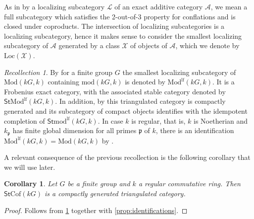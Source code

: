 \documentclass{amsart}
\def \pp{\mathfrak{p}}
\numberwithin{equation}{section}%
\newtheorem{corollary}[equation]{Corollary}
\theoremstyle{remark}
\newtheorem{remark}[equation]{Remark}
\newtheorem{recollection}[equation]{Recollection}
\begin{document}


As in \cite{BBIKP25} by a localizing subcategory $\mathcal{L}$ of an exact additive category $\mathcal{A}$, we mean a full subcategory which satisfies the 2-out-of-3 property for conflations and is closed under coproducts. The intersection of localizing subcategories is a localizing subcategory, hence it makes sense to consider the smallest localizing subcategory of $\mathcal{A}$ generated by a class $\mathcal{X}$ of objects of $\mathcal{A}$, which we denote by $\mathrm{Loc}(\mathcal{X})$.


\begin{recollection}\label{rec-modlf-comp}
By \cite[2.5]{BBIKP25} for a finite group $G$ the smallest localizing subcategory of $\mathrm{Mod}(kG,k)$ containing $\mathrm{mod}(kG,k)$ is denoted by $\mathrm{Mod}^{\mathrm{lf}}(kG,k)$. It is a Frobenius exact category, with the associated stable category denoted by $\mathsf{St}\mathrm{Mod}^{\mathrm{lf}}(kG,k)$. In addition, by \cite[Proposition~2.9]{BBIKP25} this triangulated category is compactly generated and its subcategory of compact objects identifies with the idempotent completion of $\mathsf{St}\mathrm{mod}^{\mathrm{lf}}(kG,k)$. In case $k$ is regular, that is, $k$ is Noetherian and $k_\pp$ has finite global dimension for all primes $\pp$ of $k$, there is an identification $\mathrm{Mod}^{\mathrm{lf}}(kG,k)=\mathrm{Mod}(kG,k)$ by \cite[Proposition~2.14]{BBIKP25}.
\end{recollection}  

A relevant consequence of the previous recollection is the following corollary that we will use later.  

\begin{corollary}\label{rec-regular-ring}
Let $G$ be a finite group and $k$ a regular commutative ring. Then $\mathsf{St}\mathrm{Cof}(kG)$ is a compactly generated triangulated category.
\end{corollary}

\begin{proof}

Follows from \cref{rec-modlf-comp} together with  \cref{prop:identifications}.
\end{proof}
\end{document}
